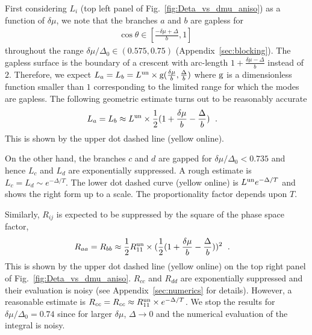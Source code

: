 \documentclass[10pt, aps, prd, superscriptaddress, nofootinbib, 
               amsmath, amssymb, twocolumn,
               preprintnumbers, showpacs,
               raggedbottom,
               floatfix]{revtex4-1}
\newcommand{\un}{{\rm{un}}}
\begin{document}
First considering $L_i$ (top left panel of Fig.~\ref{fig:Deta_vs_dmu_aniso}) as a function of $\delta\mu$, we note that the branches
$a$ and $b$ are gapless for 
\begin{equation}
\begin{split}
\cos\theta\in[\frac{-\delta\mu+\Delta}{b}, 1]~\label{eq:cthgapless_ab}
\end{split}
\end{equation}
throughout the range $\delta\mu/\Delta_{0}\in(0.575, 0.75)$
(Appendix~\ref{sec:blocking}). The gapless surface is the boundary of a crescent
with arc-length $1+\frac{\delta\mu-\Delta}{b}$ instead of $2$. Therefore, we expect
$L_a=L_b=L^{\un}\times{\rm{g}}(\frac{\delta\mu}{b},\frac{\Delta}{b})$ where
${\rm{g}}$ is a dimensionless function smaller than $1$ corresponding to the
limited range for which the modes are gapless. The following geometric 
estimate turns out to be reasonably accurate
\begin{equation}
\begin{split}
L_a=L_b&\approx
L^{\un}\times\frac{1}{2}(1+\frac{\delta\mu}{b}-\frac{\Delta}{b})
~\label{eq:Lab_FFD}\;.
\end{split}
\end{equation}
This is shown by the upper dot dashed line (yellow online).

On the other hand, the branches $c$ and $d$ are gapped for
$\delta\mu/\Delta_0<0.735$ and hence $L_c$ and $L_d$ are exponentially
suppressed. A rough estimate is  $L_c=L_d\sim  e^{-\Delta/T}$.
The lower dot dashed curve (yellow online) is $L^{\un}e^{-\Delta/T}$ and shows
the right form up to a scale. The proportionality factor depends
upon $T$. 

Similarly, $R_{ij}$ is expected to be suppressed by the square of the phase
space factor, 
\begin{equation}
\begin{split}
R_{aa}=R_{bb}&\approx
\frac{1}{2}R^{\un}_{11}\times(\frac{1}{2}(1+\frac{\delta\mu}{b}-\frac{\Delta}{b}))^2
~\label{eq:Rab_FFD}\;.
\end{split}
\end{equation}
This is shown by the upper dot dashed line (yellow online) on the top right
panel of Fig.~\ref{fig:Deta_vs_dmu_aniso}. $R_{cc}$ and $R_{dd}$ are exponentially suppressed and their evaluation is
noisy (see Appendix~\ref{sec:numerics} for details). However, a reasonable
estimate is $R_{cc}=R_{cc}\approx R^{\un}_{11}\times e^{-\Delta/T}$.
We stop the results for $\delta\mu/\Delta_0=0.74$ since for larger $\delta\mu$,
$\Delta\rightarrow 0$ and the numerical evaluation of the integral is noisy.
\end{document}
